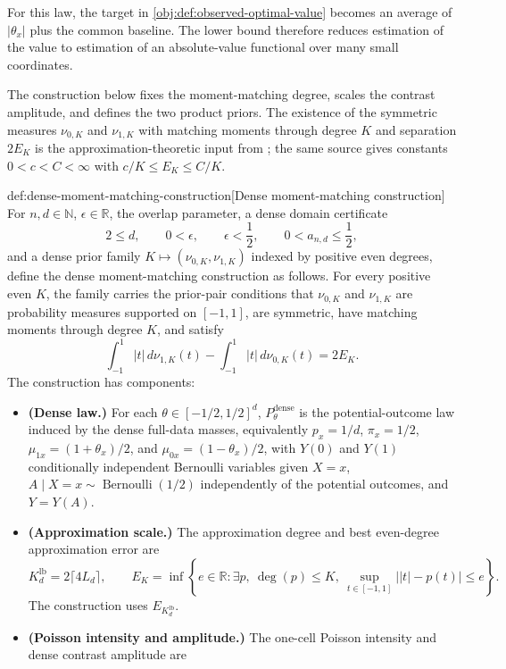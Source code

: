 For this law, the target in \cref{obj:def:observed-optimal-value} becomes an average of \(|\theta_x|\) plus the common baseline. The lower bound therefore reduces estimation of the value to estimation of an absolute-value functional over many small coordinates.

The construction below fixes the moment-matching degree, scales the contrast amplitude, and defines the two product priors. The existence of the symmetric measures \(\nu_{0,K}\) and \(\nu_{1,K}\) with matching moments through degree \(K\) and separation \(2E_K\) is the approximation-theoretic input from \citet[Lemma 1 and Section 3.1]{CaiLow2011L1}; the same source gives constants \(0<c<C<\infty\) with \(c/K\le E_K\le C/K\).

\begin{definitionv}{def:dense-moment-matching-construction}[Dense moment-matching construction]
For \(n,d\in\mathbb N\), \(\epsilon\in\mathbb R\), the overlap parameter, a dense domain certificate
\[
2\le d,\qquad
0<\epsilon,\qquad
\epsilon<\frac12,\qquad
0<a_{n,d}\le \frac12,
\]
and a dense prior family \(K\mapsto(\nu_{0,K},\nu_{1,K})\) indexed by positive even degrees, define the dense moment-matching construction as follows.  For every positive even \(K\), the family carries the prior-pair conditions that \(\nu_{0,K}\) and \(\nu_{1,K}\) are probability measures supported on \([-1,1]\), are symmetric, have matching moments through degree \(K\), and satisfy
\[
\int_{-1}^1 |t|\,d\nu_{1,K}(t)
-
\int_{-1}^1 |t|\,d\nu_{0,K}(t)
=
2E_K .
\]
The construction has components:
\begin{itemize}
\item \textbf{(Dense law.)} For each \(\theta\in[-1/2,1/2]^d\), \(P_\theta^{\mathrm{dense}}\) is the potential-outcome law induced by the dense full-data masses, equivalently \(p_x=1/d\), \(\pi_x=1/2\), \(\mu_{1x}=(1+\theta_x)/2\), and \(\mu_{0x}=(1-\theta_x)/2\), with \(Y(0)\) and \(Y(1)\) conditionally independent Bernoulli variables given \(X=x\), \(A\mid X=x\sim\operatorname{Bernoulli}(1/2)\) independently of the potential outcomes, and \(Y=Y(A)\).
\item \textbf{(Approximation scale.)} The approximation degree and best even-degree approximation error are
\[
K_d^{\mathrm{lb}}=2\lceil4L_d\rceil,
\qquad
E_K=\inf\left\{e\in\mathbb R:\exists p,\ \deg(p)\le K,\ 
\sup_{t\in[-1,1]}\bigl||t|-p(t)\bigr|\le e\right\}.
\]
The construction uses \(E_{K_d^{\mathrm{lb}}}\).
\item \textbf{(Poisson intensity and amplitude.)} The one-cell Poisson intensity and dense contrast amplitude are

\end{itemize}
\end{definitionv}
